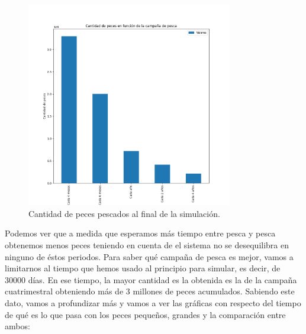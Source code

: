 \documentclass[11pt,a4paper]{report}
\begin{document}
\begin{figure}[H]
	\begin{center}
		\includegraphics[width=0.8\textwidth]{img/Cap-3/apartado-3/pescados_por_periodo.png}
		\caption{Cantidad de peces pescados al final de la simulación.}
		\label{fig:f3}
	\end{center}
\end{figure}

Podemos ver que a medida que esperamos más tiempo entre pesca y pesca obtenemos menos peces teniendo en cuenta de el sistema no se desequilibra en ninguno de éstos periodos. Para saber qué campaña de pesca es mejor, vamos a limitarnos al tiempo que hemos usado al principio para simular, es decir, de 30000 días. En ese tiempo, la mayor cantidad es la obtenida es la de la campaña cuatrimestral obteniendo más de 3 millones de peces acumulados. Sabiendo este dato, vamos a profundizar más y vamos a ver las gráficas con respecto del tiempo de qué es lo que pasa con los peces pequeños, grandes y la comparación entre ambos:
\end{document}
